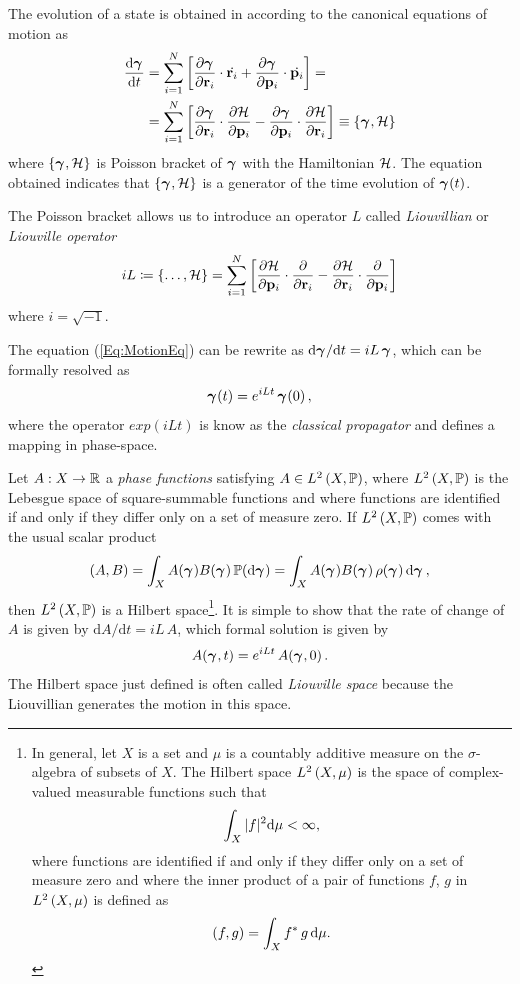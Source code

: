 \documentclass[10pt,a4paper]{book}
\theoremstyle{definition}
\begin{document}
\begin{appendices}
The evolution of a state is obtained in according to the canonical equations of motion as
\begin{equation}
\begin{split}\label{Eq:MotionEq}
  \frac{\mbox{d}\boldsymbol\gamma_{}}{\mbox{d}t} &= \sum_{i=1}^N \left[ \frac{\partial\boldsymbol\gamma_{}}{\partial\mathbf{r}_i} \cdot \dot{\mathbf{r}_i}  + \frac{\partial\boldsymbol\gamma_{}}{\partial\mathbf{p}_i} \cdot \dot{\mathbf{p}_i} \right] ={}\\
               &=\sum_{i=1}^N \left[ \frac{\partial\boldsymbol\gamma_{}}{\partial\mathbf{r}_i} \cdot \frac{\partial\mathcal{H}}{\partial\mathbf{p}_i} - \frac{\partial\boldsymbol\gamma_{}}{\partial\mathbf{p}_i} \cdot \frac{\partial\mathcal{H}}{\partial\mathbf{r}_i} \right] 
               \equiv \left\lbrace \boldsymbol\gamma_{},\mathcal{H}\right\rbrace
\end{split}
\end{equation}
where $\left\lbrace \boldsymbol\gamma_{},\mathcal{H}\right\rbrace$ is Poisson bracket of $\boldsymbol\gamma_{}$ with the Hamiltonian $\mathcal{H}$. The equation obtained indicates that $\left\lbrace \boldsymbol\gamma_{},\mathcal{H}\right\rbrace$ is a generator of the time evolution of $\boldsymbol\gamma_{}(t)$.

The Poisson bracket allows us to introduce an operator $L$ called \emph{Liouvillian} or \emph{Liouville operator} 
\begin{equation}\label{Eq:liouvilleOperator}
  iL \coloneqq \left\lbrace  \ldots,\mathcal{H}\right\rbrace = \sum_{i=1}^N \left[ \frac{\partial\mathcal{H}}{\partial\mathbf{p}_i}\cdot\frac{\partial}{\partial\mathbf{r}_i} - \frac{\partial\mathcal{H}}{\partial\mathbf{r}_i}\cdot\frac{\partial}{\partial\mathbf{p}_i} \right]
\end{equation}
where $i=\sqrt{-1}$.

The equation (\ref{Eq:MotionEq}) can be rewrite as $\mbox{d}\boldsymbol\gamma_{}/\mbox{d}t=iL\,\boldsymbol\gamma_{}$, which can be formally resolved as
$$
 \boldsymbol\gamma_{}(t) = e^{iLt} \,\boldsymbol\gamma_{}(0)\,,
$$
where the operator $exp(iLt)$ is know as the \emph{classical propagator} and defines a mapping in phase-space. 

Let $A:X\to\mathbb{R}$ a \emph{phase functions} satisfying $A\in L^2\left(X,\mathbb{P}\right)$, where $L^2\left(X,\mathbb{P}\right)$ is the Lebesgue space of square-summable functions and where functions are identified if and only if they differ only on a set of measure zero. If $L^2\left(X,\mathbb{P}\right)$ comes with the usual scalar product 
\begin{equation}\label{eq:innerProd}
\left(A,B\right)=\int_X A(\boldsymbol\gamma_{})B(\boldsymbol\gamma_{})\, \mathbb{P}(\mbox{d}\boldsymbol\gamma_{}) = \int_X A(\boldsymbol\gamma_{}) B(\boldsymbol\gamma_{})\, \rho(\boldsymbol\gamma_{})\,\mbox{d}\boldsymbol\gamma_{}\,, 
\end{equation}
then $L^2\left(X,\mathbb{P}\right)$ is a Hilbert space\footnote{
In general, let $X$ is a set and $\mu$ is a countably additive measure on the $\sigma$-algebra of subsets of $X$. The Hilbert space $L^2\left(X,\mu\right)$ is the space of complex-valued measurable functions such that
$$
\int_X|f|^2\mbox{d} \mu<\infty,
$$ 
where functions are identified if and only if they differ only on a set of measure zero and where the inner product of a pair of functions $f$, $g$ in $L^2\left(X,\mu\right)$ is defined as
$$
\left(f,g\right)=\int_Xf^*\,g\,\mbox{d} \mu.
$$
}. 
It is simple to show that the rate of change of $A$ is given by $\mbox{d}A/\mbox{d}t=iL\,A$, which formal solution is given by 
\begin{equation}
A(\boldsymbol\gamma_{},t) = e^{iLt} \,A(\boldsymbol\gamma_{},0)\,.
\end{equation}
The Hilbert space just defined is often called \emph{Liouville space} because the Liouvillian generates the motion in this space. 


\end{appendices}
\end{document}
